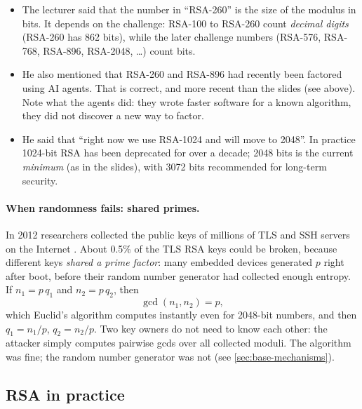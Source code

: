 \begin{remark}
\leavevmode
\begin{itemize}
    \item The lecturer said that the number in \enquote{RSA-260} is the size of the modulus in bits. It depends on the challenge: RSA-100 to RSA-260 count \emph{decimal digits} (RSA-260 has 862 bits), while the later challenge numbers (RSA-576, RSA-768, RSA-896, RSA-2048, \dots) count bits.
    \item He also mentioned that RSA-260 and RSA-896 had recently been factored using AI agents. That is correct, and more recent than the slides (see above). Note what the agents did: they wrote faster software for a known algorithm, they did not discover a new way to factor.
    \item He said that \enquote{right now we use RSA-1024 and will move to 2048}. In practice 1024-bit RSA has been deprecated for over a decade; 2048 bits is the current \emph{minimum} (as in the slides), with 3072 bits recommended for long-term security.
\end{itemize}
\end{remark}

\paragraph{When randomness fails: shared primes.} In 2012 researchers collected the public keys of millions of TLS and SSH servers on the Internet \cite{heninger2012}. About 0.5\% of the TLS RSA keys could be broken, because different keys \emph{shared a prime factor}: many embedded devices generated $p$ right after boot, before their random number generator had collected enough entropy. If $n_1 = p\,q_1$ and $n_2 = p\,q_2$, then
\[
\gcd(n_1, n_2) = p,
\]
which Euclid's algorithm computes instantly even for 2048-bit numbers, and then $q_1 = n_1/p$, $q_2 = n_2/p$. Two key owners do not need to know each other: the attacker simply computes pairwise gcds over all collected moduli. The algorithm was fine; the random number generator was not (see \cref{sec:base-mechanisms}).

\subsection{RSA in practice}
\label{sec:rsa-practice}

